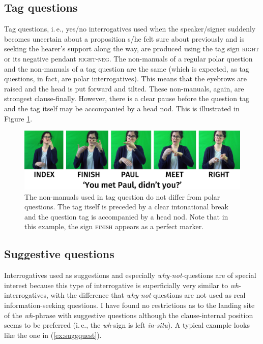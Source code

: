
\subsection{Tag questions}
Tag questions, i.\,e., yes/no interrogatives used when the speaker/signer suddenly becomes uncertain about a proposition s/he felt sure about previously and is seeking the hearer's support along the way, are produced using the tag sign \textsc{right} or its negative pendant \textsc{right-neg}. The non-manuals of a regular polar question and the non-manuals of a tag question are the same (which is expected, as tag questions, in fact, are polar interrogatives). This means that the eyebrows are raised and the head is put forward and tilted. These non-manuals, again, are strongest clause-finally. However, there is a clear pause before the question tag and the tag itself may be accompanied by a head nod. This is illustrated in Figure \ref{tagquestion}.

\begin{figure}[bt]
\centering
	\includegraphics[width=1.0\textwidth]{tagquestion.jpg}
	\caption{The non-manuals used in tag question do not differ from polar questions. The tag itself is preceded by a clear intonational break and the question tag is accompanied by a head nod. Note that in this example, the sign \textsc{finish} appears as a perfect marker.}
	\label{tagquestion}
\end{figure}



\subsection{Suggestive questions}
Interrogatives used as suggestions and especially \textit{why-not}-questions are of special interest because this type of interrogative is superficially very similar to \textit{wh}-interrogatives, with the difference that \textit{why-not}-questions are not used as real information-seeking questions. I have found no restrictions as to the landing site of the \textit{wh}-phrase with suggestive questions although the clause-internal position seems to be preferred (i.\,e., the \textit{wh}-sign is left \textit{in-situ}). A typical example looks like the one in (\ref{ex:suggquest}). 

